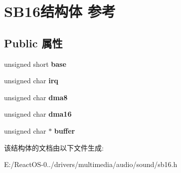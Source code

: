 \hypertarget{struct_s_b16}{}\section{S\+B16结构体 参考}
\label{struct_s_b16}
\subsection*{Public 属性}
\begin{DoxyCompactItemize}
\item 
\mbox{\label{struct_s_b16_ab9b6c91131e20bf458e1731aede03a24}} 
unsigned short {\bfseries base}
\item 
\mbox{\label{struct_s_b16_a9455618f3d7de54109f00d2760346118}} 
unsigned char {\bfseries irq}
\item 
\mbox{\label{struct_s_b16_aef43ac7328233ae209e9dce2731512a8}} 
unsigned char {\bfseries dma8}
\item 
\mbox{\label{struct_s_b16_a8d94bec93d0a30c354d6338b15c16b67}} 
unsigned char {\bfseries dma16}
\item 
\mbox{\label{struct_s_b16_a8cd139e7de692efb2ec1f5e7ec4b541f}} 
unsigned char $\ast$ {\bfseries buffer}
\end{DoxyCompactItemize}


该结构体的文档由以下文件生成\+:\begin{DoxyCompactItemize}
\item 
E\+:/\+React\+O\+S-\/0../drivers/multimedia/audio/sound/sb16.\+h\end{DoxyCompactItemize}
